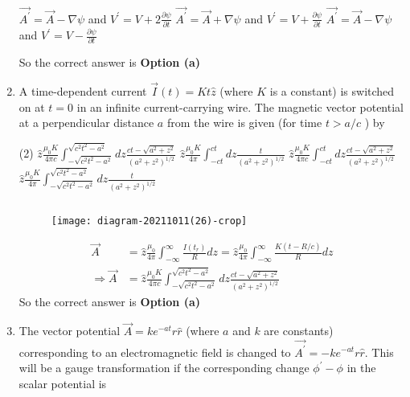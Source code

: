 \begin{enumerate}
\begin{tasks}
		\task[\textbf{b.}] $\overrightarrow{A^{\prime}}=\vec{A}-\nabla \psi$ and $V^{\prime}=V+2 \frac{\partial \psi}{\partial t}$
		\task[\textbf{c.}] $\overrightarrow{A^{\prime}}=\vec{A}+\nabla \psi$ and $V^{\prime}=V+\frac{\partial \psi}{\partial t}$
		\task[\textbf{d.}] $\overrightarrow{A^{\prime}}=\vec{A}-\nabla \psi$ and $V^{\prime}=V-\frac{\partial \psi}{\partial t}$
	\end{tasks}
\begin{answer}
	So the correct answer is \textbf{Option (a)}
\end{answer}
	\item
	 A time-dependent current $\vec{I}(t)=K t \hat{z}$ (where $K$ is a constant) is switched on at $t=0$ in an infinite current-carrying wire. The magnetic vector potential at a perpendicular distance $a$ from the wire is given (for time $t>a / c$ ) by
	{	}
	\begin{tasks}(2)
		\task[\textbf{a.}]  $\hat{z} \frac{\mu_{0} K}{4 \pi c} \int_{-\sqrt{c^{2} t^{2}-a^{2}}}^{\sqrt{c^{2} t^{2}-a^{2}}} d z \frac{c t-\sqrt{a^{2}+z^{2}}}{\left(a^{2}+z^{2}\right)^{1 / 2}}$
		\task[\textbf{b.}]  $\hat{z} \frac{\mu_{0} K}{4 \pi} \int_{-c t}^{c t} d z \frac{t}{\left(a^{2}+z^{2}\right)^{1 / 2}}$
		\task[\textbf{c.}] $\hat{z} \frac{\mu_{0} K}{4 \pi c} \int_{-c t}^{c t} d z \frac{c t-\sqrt{a^{2}+z^{2}}}{\left(a^{2}+z^{2}\right)^{1 / 2}}$
		\task[\textbf{d.}] $\hat{z} \frac{\mu_{0} K}{4 \pi} \int_{-\sqrt{c^{2} t^{2}-a^{2}}}^{\sqrt{c^{2} t^{2}-a^{2}}} d z \frac{t}{\left(a^{2}+z^{2}\right)^{1 / 2}}$
	\end{tasks}
	\begin{answer}$\left. \right. $
		\begin{figure}[H]
			\centering
			\texttt{[image: diagram-20211011(26)-crop]}
		\end{figure}
		\begin{align*}
		\vec{A}&=\hat{z} \frac{\mu_{0}}{4 \pi} \int_{-\infty}^{\infty} \frac{I\left(t_{r}\right)}{R} d z=\hat{z} \frac{\mu_{0}}{4 \pi} \int_{-\infty}^{\infty} \frac{K(t-R / c)}{R} d z\\
		\Rightarrow \vec{A}&=\hat{z} \frac{\mu_{0} K}{4 \pi c} \int_{-\sqrt{c^{2} t^{2}-a^{2}}}^{\sqrt{c^{2} t^{2}-a^{2}}} d z \frac{c t-\sqrt{a^{2}+z^{2}}}{\left(a^{2}+z^{2}\right)^{1 / 2}}
		\end{align*}
		So the correct answer is \textbf{Option (a)}
	\end{answer}
	\item  The vector potential $\vec{A}=k e^{-a t} r \hat{r}$ (where $a$ and $k$ are constants) corresponding to an electromagnetic field is changed to $\overrightarrow{A^{\prime}}=-k e^{-a t} r \hat{r}$. This will be a gauge transformation if the corresponding change $\phi^{\prime}-\phi$ in the scalar potential is

\end{enumerate}
